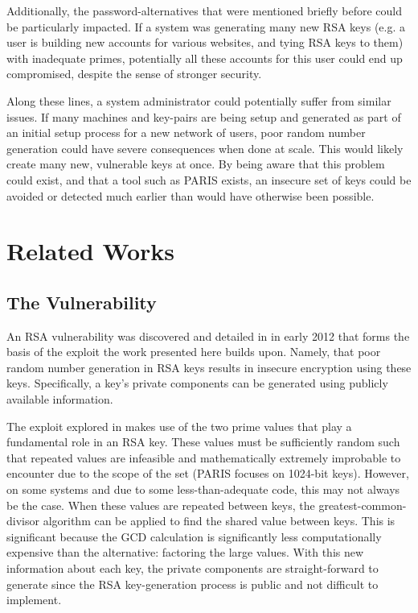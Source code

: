 \documentclass[smallextended]{svjour3}       %
\begin{document}
Additionally, the password-alternatives that were mentioned briefly before
could be particularly impacted. If a system was generating many new RSA keys
(e.g. a user is building new accounts for various websites, and tying RSA keys
to them) with inadequate primes, potentially all these accounts for this user
could end up compromised, despite the sense of stronger security.

Along these lines, a system administrator could potentially suffer from similar
issues. If many machines and key-pairs are being setup and generated as part of
an initial setup process for a new network of users, poor random number
generation could have severe consequences when done at scale. This would likely
create many new, vulnerable keys at once. By being aware that this problem
could exist, and that a tool such as PARIS exists, an insecure set of keys 
could be avoided or detected much earlier than would have otherwise been
possible.  


\section{Related Works}
\label{sec:related}

\subsection{The Vulnerability}
\label{subsec:vuln}
An RSA vulnerability was discovered and detailed in \cite{lenstra2012ron} in
early 2012 that forms the basis of the exploit the work presented here builds
upon. Namely, that poor random number generation in RSA keys results in
insecure encryption using these keys. Specifically, a key's private components
can be generated using publicly available information.

The exploit explored in \cite{lenstra2012ron} makes use of the two prime
values that play a fundamental role in an RSA key. These values must be
sufficiently random such that repeated values are infeasible and mathematically
extremely improbable to encounter due to the scope of the set (PARIS focuses on
1024-bit keys). However, on some systems and due to some less-than-adequate
code, this may not always be the case. When these values are repeated between
keys, the greatest-common-divisor algorithm can be applied to find the shared
value between keys. This is significant because the GCD calculation is
significantly less computationally expensive than the alternative: factoring
the large values. With this new information about each key, the private
components are straight-forward to generate since the RSA key-generation
process is public and not difficult to implement.  
\end{document}
